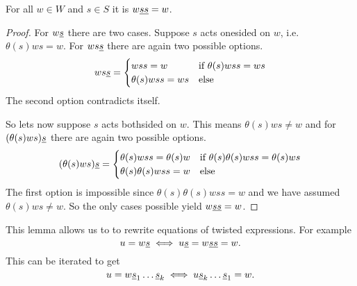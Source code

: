 \begin{lemm}
	For all $w \in W$ and $s \in S$ it is $w \underline{ss} = w$.

	\begin{proof}
		For $w \underline{s}$ there are two cases. Suppose $s$ acts onesided on $w$, i.e. $\theta(s)ws = w$. For $ws \underline{s}$ there are again two possible options.
		$$ ws \underline{s} = \begin{cases}
			wss = w & \textrm{if } \theta(s)wss = ws \\
			\theta(s)wss = ws & \textrm{else} \\
		\end{cases} $$
		The second option contradicts itself.

		So lets now suppose $s$ acts bothsided on $w$. This means $\theta(s)ws \neq w$ and for $(\theta(s)ws) \underline{s}$ there are again two possible options.
		$$ (\theta(s)ws) \underline{s} = \begin{cases}
			\theta(s)wss = \theta(s)w & \textrm{if } \theta(s) \theta(s) w ss = \theta(s) w s \\
			\theta(s)\theta(s)wss = w & \textrm{else} \\
		\end{cases} $$
		The first option is impossible since $\theta(s) \theta(s) w ss = w$ and we have assumed $\theta(s)ws \neq w$. So the only cases possible yield $w \underline{s} \underline{s} = w$.
	\end{proof}
\end{lemm}

\begin{rema}
	This lemma allows us to to rewrite equations of twisted expressions. For example
	$$ u = w \underline{s} \iff u \underline{s} = w \underline{s} \underline{s} = w. $$
	This can be iterated to get
	$$ u = w \underline{s}_1 \ldots \underline{s}_k \iff u \underline{s}_k \ldots \underline{s}_1 = w. $$
\end{rema}

